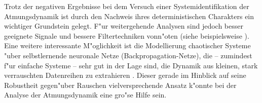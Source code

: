 Trotz der negativen Ergebnisse bei dem Versuch einer Systemidentifikation der
Atmungsdynamik ist durch den
Nachweis ihres deterministischen Charakters ein wichtiger Grundstein gelegt. F"ur
weitergehende Analysen sind jedoch besser geeignete Signale und bessere Filtertechniken
vonn"oten (siehe beispielsweise \cite{Rao92}).  Eine weitere interessante M"oglichkeit ist
die Modellierung chaotischer Systeme "uber selbstlernende neuronale Netze
(Back\-pro\-pa\-ga\-tion-Netze), die -- zumindest f"ur einfache Systeme -- sehr gut in der 
Lage sind, die Dynamik aus kleinen, stark verrauschten Datenreihen zu extrahieren
\cite{Albano92}. Dieser gerade im Hinblick auf seine Robustheit 
gegen"uber Rauschen vielversprechende Ansatz k"onnte bei der Analyse der Atmungsdynamik
eine gro"se Hilfe sein.



